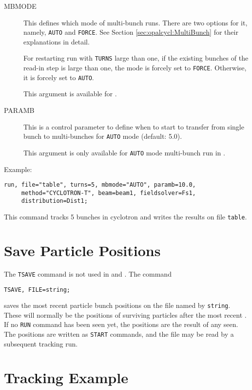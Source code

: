 \begin{description}
\item[MBMODE]
  This defines which mode of multi-bunch runs. There are two options for it, namely, \texttt{AUTO} and \texttt{FORCE}. 
  See Section \ref{sec:opalcycl:MultiBunch} for their explanations in detail.
  
  For restarting run with \texttt{TURNS} large than one, if the existing bunches of the read-in step is large than one, 
  the mode is forcely set to \texttt{FORCE}. Otherwise, it is forcely set to \texttt{AUTO}.

  This argument is available for \opalcycl.
  
\item[PARAMB]
   This is a control parameter to define when to start to transfer from single bunch to multi-bunches for \texttt{AUTO} mode (default: 5.0). 

   This argument is only available for \texttt{AUTO} mode multi-bunch run in \opalcycl.

\end{description}
Example:
\begin{verbatim}
run, file="table", turns=5, mbmode="AUTO", paramb=10.0,
     method="CYCLOTRON-T", beam=beam1, fieldsolver=Fs1,
     distribution=Dist1;
\end{verbatim}

This command tracks 5 bunches in cyclotron and writes the results on file \texttt{table}.

\section{Save Particle Positions}
\label{sec:tracksave}
The \texttt{TSAVE} command is not used in \noopalt and \noopalcycl . The command
\begin{verbatim}
TSAVE, FILE=string;
\end{verbatim}
saves the most recent particle bunch positions on the file named by 
\texttt{string}.
These will normally be the positions of surviving particles after the
most recent .
If no \texttt{RUN} command has been seen yet,
the positions are the result of any 
 seen.
The positions are written as \texttt{START} commands,
and the file may be read by a subsequent tracking run.


\section{Tracking Example}
\label{sec:trackxmpl}

